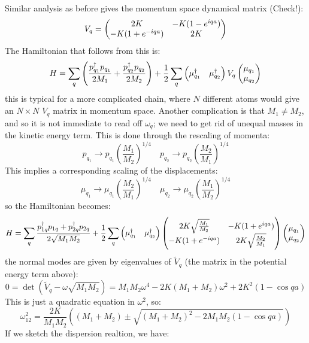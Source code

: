 Similar analysis as before gives the momentum space dynamical matrix (Check!):
\begin{equation}
    V_q = \begin{pmatrix}2K & -K(1-e^{iqa}) \\ -K(1+e^{-iqa}) & 2K\end{pmatrix}
\end{equation}
The Hamiltonian that follows from this is:
\begin{equation}
    H = \sum_q \left(\frac{p_{q_1}^\dagger p_{q_1}}{2M_1} + \frac{p_{q_2}^\dagger p_{q_2}}{2M_2}\right) + \frac{1}{2}\sum_{q}\begin{pmatrix}\mu_{q_1}^\dagger & \mu_{q_2}^\dagger\end{pmatrix} V_{q}\begin{pmatrix}\mu_{q_1} \\ \mu_{q_2}\end{pmatrix}
\end{equation}
this is typical for a more complicated chain, where $N$ different atoms would give an $N \times N$ $V_q$ matrix in momentum space. Another complication is that $M_1 \neq M_2$, and so it is not immediate to read off $\omega_q$; we need to get rid of unequal masses in the kinetic energy term. This is done through the rescaling of momenta:
\begin{equation}
    p_{q_1} \to p_{q_1}\left(\frac{M_1}{M_2}\right)^{1/4} \quad p_{q_2} \to p_{q_2}\left(\frac{M_2}{M_1}\right)^{1/4}
\end{equation}
This implies a corresponding scaling of the displacements:
\begin{equation}
    \mu_{q_1} \to \mu_{q_1}\left(\frac{M_2}{M_1}\right)^{1/4} \quad \mu_{q_2} \to \mu_{q_2}\left(\frac{M_1}{M_2}\right)^{1/4}
\end{equation}
so the Hamiltonian becomes:
\begin{equation}
    H = \sum_q \frac{p_{1q}^\dagger p_{1q} + p_{2q}^\dagger p_{2q}}{2\sqrt{M_1M_2}} + \frac{1}{2}\sum_q \begin{pmatrix}\mu_{q_1}^\dagger & \mu_{q_2}^\dagger\end{pmatrix} \begin{pmatrix}2K\sqrt{\frac{M_1}{M_2}} & -K(1+e^{iqa}) \\ -K(1+e^{-iqa}) & 2K\sqrt{\frac{M_2}{M_1}}\end{pmatrix}\begin{pmatrix}\mu_{q_1} \\ \mu_{q_2}\end{pmatrix}
\end{equation}
the normal modes are given by eigenvalues of $\tilde{V}_q$ (the matrix in the potential energy term above):
\begin{equation}
    0 = \det(\tilde{V}_q - \omega\sqrt{M_1M_2}) = M_1M_2\omega^4 - 2K(M_1+ M_2)\omega^2 + 2K^2(1-\cos qa)
\end{equation}
This is just a quadratic equation in $\omega^2$, so:
\begin{equation}
    \omega_{12}^2 = \frac{2K}{M_1M_2}\left((M_1 + M_2) \pm \sqrt{(M_1 + M_2)^2 - 2M_1M_2(1 - \cos qa)}\right)
\end{equation}
If we sketch the dispersion realtion, we have:

